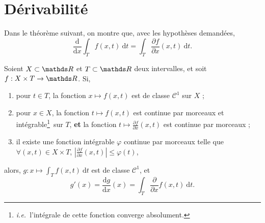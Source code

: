 \section{Dérivabilité}

Dans le théorème suivant, on montre que, avec les hypothèses demandées, \[
	\frac{\mathrm{d}}{\mathrm{d}x} \int_{T} f(x,t)~\mathrm{d}t = \int_{T} \frac{\partial f}{\partial x}(x,t) ~\mathrm{d}t
.\]

\begin{thm}
	Soient $X \subset \R$ et $T \subset \R$\/ deux intervalles, et soit $f : X \times T \to \R$.
	Si,
	\begin{enumerate}
		\item pour $t \in T$, la fonction $x \mapsto f(x,t)$\/ est de classe $\mathcal{C}^1$ sur $X$\/ ;
		\item pour $x \in X$, la fonction $t \mapsto f(x,t)$\/ est continue par morceaux et intégrable\footnote{\textit{i.e.}\ l'intégrale de cette fonction converge absolument.}\ sur $T$, \textbf{et} la fonction $t \mapsto \frac{\partial f}{\partial x}(x,t)$\/ est continue par morceaux ;
		\item il existe une fonction intégrable $\varphi$\/ continue par morceaux telle que $\forall (x,t) \in X \times T$, $\left| \frac{\partial f}{\partial x}(x,t) \right| \le \varphi(t)$,
	\end{enumerate}
	alors, $g : x \mapsto \int_{T} f(x,t)~\mathrm{d}t$\/ est de classe $\mathcal{C}^1$, et \[
		g'(x) = \frac{\mathrm{d}g}{\mathrm{d}x}(x) = \int_{T} \frac{\partial }{\partial x} f(x,t)~\mathrm{d}t
	.\]
\end{thm}

